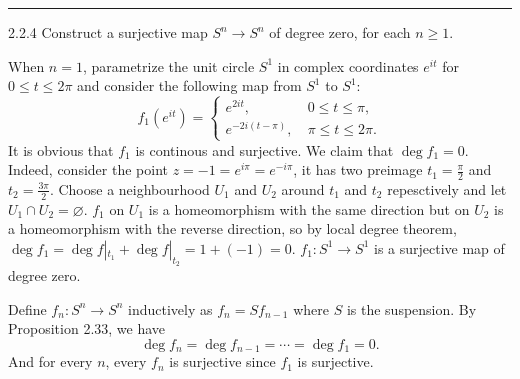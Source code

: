 \documentclass[a4paper, 12pt]{article}
\begin{document}
\noindent\rule{7in}{2.8pt}
\begin{problem}{2.2.4}
Construct a surjective map \(S^n\rightarrow S^n\) of degree zero, for each \(n\geq 1\).
\end{problem}
\begin{solution}
When \(n=1\), parametrize the unit circle \(S^1\) in complex coordinates \(e^{i t}\) for \(0\leq t\leq 2\pi\) and consider the following map from \(S^1\) to \(S^1\):
\[f_1(e^{i t})=\begin{cases}
    e^{2 i t},&\  0\leq t\leq \pi,\\ 
    e^{-2i(t-\pi)},&\ \pi\leq t\leq 2\pi.
\end{cases}\]
It is obvious that \(f_1\) is continous and surjective. We claim that \(\deg f_1=0\). Indeed, consider the point \(z=-1=e^{i\pi}=e^{-i\pi}\), it has two preimage \(t_1=\frac{\pi}{2}\) and \(t_2=\frac{3\pi}{2}\). 
Choose a neighbourhood \(U_1\) and \(U_2\) around \(t_1\) and \(t_2\) repesctively and let \(U_1\cap U_2=\varnothing \). \(f_1\) on \(U_1\) is a homeomorphism with the same direction but on \(U_2\) is a homeomorphism with 
the reverse direction, so by local degree theorem, \(\deg f_1=\deg f|_{t_1}+\deg f|_{t_2}=1+(-1)=0\). \(f_1:S^1\rightarrow S^1\) is a surjective map of degree zero.

Define \(f_n:S^n\rightarrow S^n\) inductively as \(f_n=Sf_{n-1}\) where \(S\) is the suspension. By Proposition 2.33, we have
\[\deg f_n=\deg f_{n-1}=\cdots=\deg f_1=0.\] 
And for every \(n\), every \(f_n\) is surjective since \(f_1\) is surjective.
\end{solution}
\end{document}
